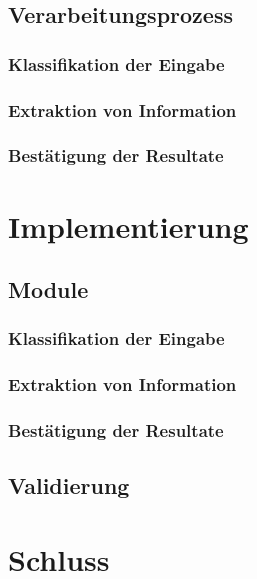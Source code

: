 \section{Verarbeitungsprozess}
\subsection{Klassifikation der Eingabe}
\subsection{Extraktion von Information}
\subsection{Bestätigung der Resultate}

\chapter{Implementierung}
\section{Module}
\subsection{Klassifikation der Eingabe}
\subsection{Extraktion von Information}
\subsection{Bestätigung der Resultate}
\section{Validierung}

\chapter{Schluss}


